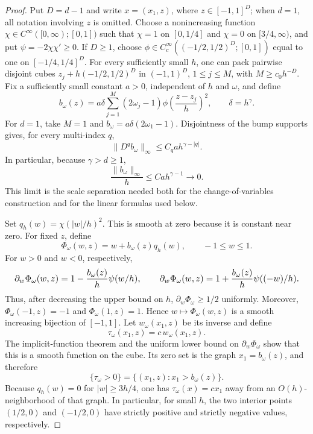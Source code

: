 \documentclass{article}
\begin{document}
\begin{proof}
Put \(D=d-1\) and write \(x=(x_1,z)\), where \(z\in[-1,1]^D\); when \(d=1\), all notation involving \(z\) is omitted. Choose a nonincreasing function \(\chi\in C^\infty([0,\infty);[0,1])\) such that \(\chi=1\) on \([0,1/4]\) and \(\chi=0\) on \([3/4,\infty)\), and put \(\psi=-2\chi\chi'\ge0\). If \(D\ge1\), choose \(\phi\in C_c^\infty((-1/2,1/2)^D;[0,1])\) equal to one on \([-1/4,1/4]^D\). For every sufficiently small \(h\), one can pack pairwise disjoint cubes \(z_j+h(-1/2,1/2)^D\) in \((-1,1)^D\), \(1\le j\le M\), with \(M\ge c_0h^{-D}\). Fix a sufficiently small constant \(a>0\), independent of \(h\) and \(\omega\), and define
\[
 b_\omega(z)=a\delta\sum_{j=1}^M(2\omega_j-1)\phi\!\left(\frac{z-z_j}{h}\right)^2,
 \qquad \delta=h^\gamma.
\]
For \(d=1\), take \(M=1\) and \(b_\omega=a\delta(2\omega_1-1)\). Disjointness of the bump supports gives, for every multi-index \(q\),
\[
 \|D^q b_\omega\|_\infty\le C_q a h^{\gamma-|q|}.
\]
In particular, because \(\gamma>d\ge1\),
\[
 \frac{\|b_\omega\|_\infty}{h}\le Ca h^{\gamma-1}\longrightarrow0.
\]
This limit is the scale separation needed both for the change-of-variables construction and for the linear formulas used below.

Set \(q_h(w)=\chi(|w|/h)^2\). This is smooth at zero because it is constant near zero. For fixed \(z\), define
\[
 \Phi_\omega(w,z)=w+b_\omega(z)q_h(w),\qquad -1\le w\le1.
\]
For \(w>0\) and \(w<0\), respectively,
\[
\makebox[\linewidth][c]{\resizebox{0.98\linewidth}{!}{\(\displaystyle \partial_w\Phi_\omega(w,z)
 =1-\frac{b_\omega(z)}h\psi(w/h),
 \qquad
 \partial_w\Phi_\omega(w,z)
 =1+\frac{b_\omega(z)}h\psi((-w)/h).\)}}
\]
Thus, after decreasing the upper bound on \(h\), \(\partial_w\Phi_\omega\ge1/2\) uniformly. Moreover, \(\Phi_\omega(-1,z)=-1\) and \(\Phi_\omega(1,z)=1\). Hence \(w\mapsto\Phi_\omega(w,z)\) is a smooth increasing bijection of \([-1,1]\). Let \(w_\omega(x_1,z)\) be its inverse and define
\[
 \tau_\omega(x_1,z)=c\,w_\omega(x_1,z).
\]
The implicit-function theorem and the uniform lower bound on \(\partial_w\Phi_\omega\) show that this is a smooth function on the cube. Its zero set is the graph \(x_1=b_\omega(z)\), and therefore
\[
 \{\tau_\omega>0\}=\{(x_1,z):x_1>b_\omega(z)\}.
\]
Because \(q_h(w)=0\) for \(|w|\ge3h/4\), one has \(\tau_\omega(x)=cx_1\) away from an \(O(h)\)-neighborhood of that graph. In particular, for small \(h\), the two interior points \((1/2,0)\) and \((-1/2,0)\) have strictly positive and strictly negative values, respectively.


\end{proof}
\end{document}
